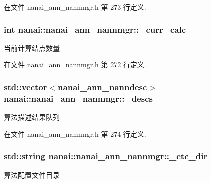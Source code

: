 在文件 nanai\+\_\+ann\+\_\+nannmgr.\+h 第 273 行定义.

\hypertarget{classnanai_1_1nanai__ann__nannmgr_a8531ad0d6391af0c318f286b44fd0604}{}
\subsubsection[{\+\_\+curr\+\_\+calc}]{\setlength{\rightskip}{0pt plus 5cm}int nanai\+::nanai\+\_\+ann\+\_\+nannmgr\+::\+\_\+curr\+\_\+calc\hspace{0.3cm}{\ttfamily [protected]}}\label{classnanai_1_1nanai__ann__nannmgr_a8531ad0d6391af0c318f286b44fd0604}
当前计算结点数量 

在文件 nanai\+\_\+ann\+\_\+nannmgr.\+h 第 272 行定义.

\hypertarget{classnanai_1_1nanai__ann__nannmgr_a4ffd16017f8b8a0aa6dbd0c3210c13d2}{}
\subsubsection[{\+\_\+descs}]{\setlength{\rightskip}{0pt plus 5cm}std\+::vector$<${\bf nanai\+\_\+ann\+\_\+nanndesc}$>$ nanai\+::nanai\+\_\+ann\+\_\+nannmgr\+::\+\_\+descs\hspace{0.3cm}{\ttfamily [protected]}}\label{classnanai_1_1nanai__ann__nannmgr_a4ffd16017f8b8a0aa6dbd0c3210c13d2}
算法描述结果队列 

在文件 nanai\+\_\+ann\+\_\+nannmgr.\+h 第 274 行定义.

\hypertarget{classnanai_1_1nanai__ann__nannmgr_a0da1bf8be2e30b97f5414dbba84a9e4c}{}
\subsubsection[{\+\_\+etc\+\_\+dir}]{\setlength{\rightskip}{0pt plus 5cm}std\+::string nanai\+::nanai\+\_\+ann\+\_\+nannmgr\+::\+\_\+etc\+\_\+dir\hspace{0.3cm}{\ttfamily [protected]}}\label{classnanai_1_1nanai__ann__nannmgr_a0da1bf8be2e30b97f5414dbba84a9e4c}
算法配置文件目录 

